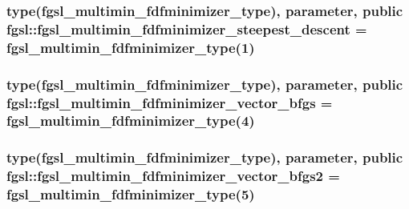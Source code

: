 \hypertarget{classfgsl_a30855ab98d924e9fa284bc2d50170b82}{
\subsubsection[{fgsl\-\_\-multimin\-\_\-fdfminimizer\-\_\-steepest\-\_\-descent}]{\setlength{\rightskip}{0pt plus 5cm}type({\bf fgsl\-\_\-multimin\-\_\-fdfminimizer\-\_\-type}), parameter, public fgsl\-::fgsl\-\_\-multimin\-\_\-fdfminimizer\-\_\-steepest\-\_\-descent = {\bf fgsl\-\_\-multimin\-\_\-fdfminimizer\-\_\-type}(1)}}\label{classfgsl_a30855ab98d924e9fa284bc2d50170b82}
\hypertarget{classfgsl_a98f35d82aab613681b886c2582cb98d2}{
\subsubsection[{fgsl\-\_\-multimin\-\_\-fdfminimizer\-\_\-vector\-\_\-bfgs}]{\setlength{\rightskip}{0pt plus 5cm}type({\bf fgsl\-\_\-multimin\-\_\-fdfminimizer\-\_\-type}), parameter, public fgsl\-::fgsl\-\_\-multimin\-\_\-fdfminimizer\-\_\-vector\-\_\-bfgs = {\bf fgsl\-\_\-multimin\-\_\-fdfminimizer\-\_\-type}(4)}}\label{classfgsl_a98f35d82aab613681b886c2582cb98d2}
\hypertarget{classfgsl_a6cc130b66b81b66a085cfb1882c711e6}{
\subsubsection[{fgsl\-\_\-multimin\-\_\-fdfminimizer\-\_\-vector\-\_\-bfgs2}]{\setlength{\rightskip}{0pt plus 5cm}type({\bf fgsl\-\_\-multimin\-\_\-fdfminimizer\-\_\-type}), parameter, public fgsl\-::fgsl\-\_\-multimin\-\_\-fdfminimizer\-\_\-vector\-\_\-bfgs2 = {\bf fgsl\-\_\-multimin\-\_\-fdfminimizer\-\_\-type}(5)}}\label{classfgsl_a6cc130b66b81b66a085cfb1882c711e6}
